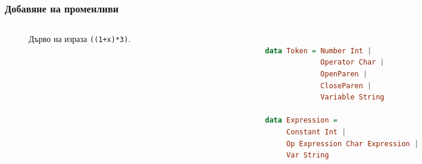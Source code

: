 \documentclass{beamer}
\begin{document}
\begin{frame}[fragile]
  \frametitle{Добавяне на променливи}


\begin{columns}[t]
  \begin{column}{0.3\textwidth}

    \begin{figure}
      \centering
      \caption{Дърво на израза \texttt{((1+x)*3)}.}
      \label{fig:treeexpr}
      \end{figure}
      

  \end{column}
  \begin{column}{0.7\textwidth}

\begin{lstlisting}[basicstyle=\small,language=Haskell]

data Token = Number Int | 
             Operator Char | 
             OpenParen | 
             CloseParen |
             Variable String

data Expression = 
     Constant Int | 
     Op Expression Char Expression |
     Var String
     

\end{lstlisting}

  \end{column}
\end{columns}

\end{frame}  
\end{document}

